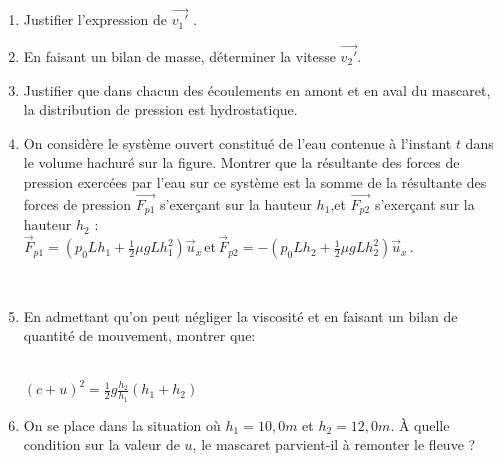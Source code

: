 \documentclass{article}
\begin{document}
\begin{enumerate}
  \item Justifier l’expression de $\vec{v_1'}$ .
  \item En faisant un bilan de masse, déterminer la vitesse $\vec{v_2'}$.
  \item Justifier que dans chacun des écoulements en amont et en aval du mascaret, la distribution
  de pression est hydrostatique.
\item On considère le système ouvert constitué de l’eau contenue à l’instant $t$ dans le volume
  hachuré sur la figure. Montrer que la résultante des forces de pression exercées par l’eau sur
  ce système est la somme de la résultante des forces de pression $\vec{F_{p1}}$ s’exerçant sur la hauteur
  $h_1$,et $\vec{F_{p2}}$ s’exerçant sur la hauteur $h_2$ :
  \\[0.1cm]



  $\vec{F}_{p1}=\left(p_{0}L h_{1}+\frac{1}{2}\mu g L h_{1}^{2}\right)\overrightarrow{u}_{x}\,\mathrm{et}\,\overrightarrow{F}_{p2}=-\left(p_{0}L h_{2}+\frac{1}{2}\mu g L h_{2}^{2}\right)\overrightarrow{u}_{x}\,.$


  \\[0.1cm]



\item En admettant qu'on peut négliger la viscosité et en faisant un bilan de quantité de mouvement, montrer que: 


\\ 

$(c+u)^{2}={\frac{1}{2}}g{\frac{h_{2}}{h_{1}}}(h_{1}+h_{2})\,$

\item On se place dans la situation où $h_1 = 10,0m$ et $h_2 = 12,0 m$. 
À quelle condition sur la valeur de $u$, le mascaret parvient-il à remonter le fleuve ?

\end{enumerate}
\end{document}
